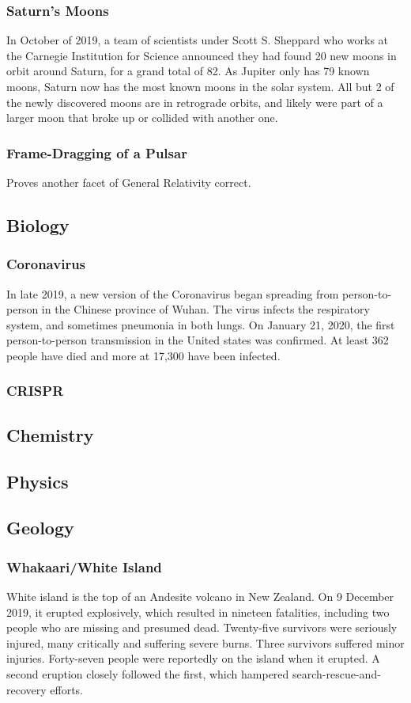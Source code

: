			
			\subsubsection{Saturn's Moons}
				In October of 2019, a team of scientists under Scott S. Sheppard who works at the Carnegie Institution for Science announced they had found 20 new moons in orbit around Saturn, for a grand total of 82. As Jupiter only has 79 known moons, Saturn now has the most known moons in the solar system.  All but 2 of the newly discovered moons are in retrograde orbits, and likely were part of a larger moon that broke up or collided with another one. 
			\subsubsection{Frame-Dragging of a Pulsar}
				Proves another facet of General Relativity correct.  
				
		\subsection{Biology}
			\subsubsection{Coronavirus}
			\label{Coronavirus} In late 2019, a new version of the Coronavirus began spreading from person-to-person in the Chinese province of Wuhan.  The virus infects the respiratory system, and sometimes pneumonia in both lungs.  On January 21, 2020, the first person-to-person transmission in the United states was confirmed.  At least 362 people have died and more at 17,300 have been infected.
			
			
			
			\subsubsection{CRISPR}
			
		
		\subsection{Chemistry}
		\subsection{Physics}
		\subsection{Geology}
			\subsubsection{Whakaari/White Island}
			White island is the top of an Andesite volcano in New Zealand.  On 9 December 2019, it erupted explosively, which resulted in nineteen fatalities, including two people who are missing and presumed dead. Twenty-five survivors were seriously injured, many critically and suffering severe burns. Three survivors suffered minor injuries. Forty-seven people were reportedly on the island when it erupted. A second eruption closely followed the first, which hampered search-rescue-and-recovery efforts. 
			
		